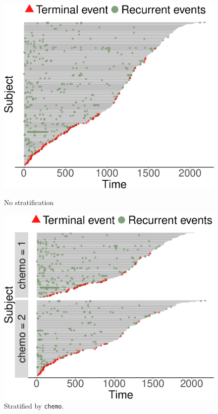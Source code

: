 \vspace*{-.3cm}\begin{figure}[H]
    \centering
    \begin{minipage}{0.24\textwidth}
        \centering
        \includegraphics[scale = .25]{recur-figs/ep-1}
        \caption{No stratification}
    \end{minipage}\hfill
    \begin{minipage}{0.24\textwidth}
        \centering
        \includegraphics[scale = .25]{recur-figs/ep-2}
        \caption{Stratified by \texttt{chemo}.}
    \end{minipage}
\end{figure}
